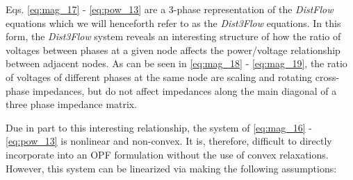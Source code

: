 
Eqs. \eqref{eq:mag_17} - \eqref{eq:pow_13} are a 3-phase representation of the \emph{DistFlow} equations \cite{baran1989optimal} which we will henceforth refer to as the \emph{Dist3Flow} equations.  In this form, the \emph{Dist3Flow} system reveals an interesting structure of how the ratio of voltages between phases at a given node affects the power/voltage relationship between adjacent nodes.  As can be seen in \eqref{eq:mag_18} - \eqref{eq:mag_19}, the ratio of voltages of different phases at the same node are scaling and rotating cross-phase impedances, but do not affect impedances along the main diagonal of a three phase impedance matrix.

Due in part to this interesting relationship, the system of \eqref{eq:mag_16} - \eqref{eq:pow_13} is nonlinear and non-convex.  It is, therefore, difficult to directly incorporate into an OPF formulation without the use of convex relaxations.  However, this system can be linearized via making the following assumptions:

